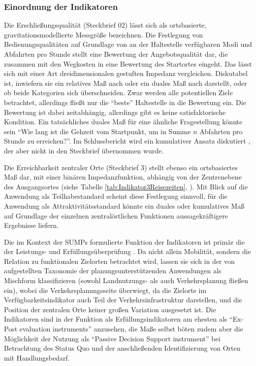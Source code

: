 \documentclass[11pt,pdftex,a4paper]{scrartcl}
\begin{document}
	\subsubsection{Einordnung der Indikatoren}
	Die Erschließungsqualität (Steckbrief 02) lässt sich als ortsbasierte, gravitationsmodellierte Messgröße bezeichnen. Die Festlegung von Bedienungsqualitäten auf Grundlage von an der Haltestelle verfügbaren Modi und Abfahrten pro Stunde stellt eine Bewertung der Angebotsqualität dar, die zusammen mit den Wegkosten in eine Bewertung des Startortes eingeht. Das lässt sich mit einer Art dreidimensionalen gestuften Impedanz vergleichen. Diskutabel ist, inwiefern sie ein relatives Maß nach \textcite{hansenHowAccessibilityShapes1959} oder ein duales Maß nach \textcite{levinsonTransportAccessManual2020} darstellt, oder ob beide Kategorien sich überschneiden. Zwar werden alle potentiellen Ziele betrachtet, allerdings fließt nur die \enquote{beste} Haltestelle in die Bewertung ein. Die Bewertung ist dabei zeitabhängig, allerdings gibt es keine satisfaktorische Kondition. Ein tatsächliches duales Maß für eine ähnliche Fragestellung könnte sein \enquote{Wie lang ist die Gehzeit vom Startpunkt, um in Summe $n$ Abfahrten pro Stunde zu erreichen?}. Im Schlussbericht wird ein kumulativer Ansatz diskutiert \parencite[87,177: Summe der erreichten Abfahrten]{kcwgmbhMethodikUndEmpfehlungen2024}, der aber nicht in den Steckbrief übernommen wurde.

	Die Erreichbarkeit zentraler Orte (Steckbrief 3) stellt ebenso ein ortsbasiertes Maß dar, mit einer binären Impedanzfunktion, abhängig von der Zentrenebene des Ausgangsortes (siehe Tabelle \ref{tab:Indikator3Reisezeiten}, \pageref{tab:Indikator3Reisezeiten}). Mit Blick auf die Anwendung als Teilhabestandard scheint diese Festlegung sinnvoll, für die Anwendung als Attraktivitätsstandard könnte ein duales oder kumulatives Maß auf Grundlage der einzelnen zentralörtlichen Funktionen aussagekräftigere Ergebnisse liefern.
	
	Die im Kontext der SUMPs formulierte Funktion der Indikatoren ist primär die der Leistungs- und Erfüllungsüberprüfung \parencite{CommissionRecommendationEU2023}. Da nicht allein Mobilität, sondern die Relation zu funktionalen Zielorten betrachtet wird, lassen sie sich in der von \textcite[60ff]{papaAccessibilityInstrumentsPlanning2016} aufgestellten Taxonomie der planungsunterstützenden Anwendungen als Mischform klassifizieren (sowohl Landnutzungs- als auch Verkehrsplanung fließen ein), wobei die Verkehrsplanungsseite überwiegt, da die Zielorte im Verfügbarkeitsindikator auch Teil der Verkehrsinfrastruktur darstellen, und die Position der zentralen Orte keiner großen Variation ausgesetzt ist. Die Indikatoren sind in der Funktion als Erfüllungsindikatoren am ehesten als \enquote{Ex-Post evaluation instruments} \parencite[62]{papaAccessibilityInstrumentsPlanning2016} anzusehen, die Maße selbst böten zudem aber die Möglichkeit der Nutzung als \enquote{Passive Decision Support instrument} bei Betrachtung des Status Quo und der anschließenden Identifizierung von Orten mit Handlungsbedarf. 
\end{document}
